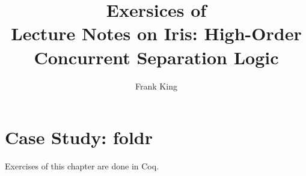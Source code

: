 \documentclass[10pt]{article}
\title{Exersices of \\ \bfseries Lecture Notes on Iris: High-Order Concurrent Separation Logic}
\author{Frank King}
\begin{document}
\maketitle
\tableofcontents

\setcounter{section}{2}


\section{Case Study: foldr}

Exercises of this chapter are done in Coq.
\end{document}
